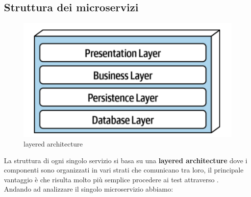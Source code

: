 \subsection{Struttura dei microservizi}\label{StrutturaMicroservizi}
\begin{figure}[H]
	\centering
	\includegraphics[scale=0.4]{Immagini/Backend/layer.png}
	\caption{layered architecture}
	\label{fig:layer}
\end{figure}
La struttura di ogni singolo servizio si basa su una \textbf{layered architecture} dove i componenti sono organizzati in vari strati che comunicano tra loro, il principale vantaggio è che risulta molto più semplice procedere ai test attraverso .\\
Andando ad analizzare il singolo microservizio abbiamo:
